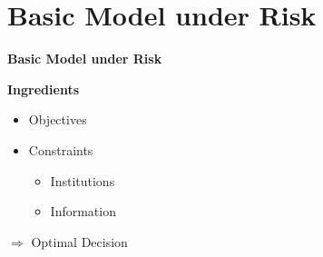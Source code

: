 \section{Basic Model under Risk}
\begin{frame}\begin{center}
\LARGE\textbf{Basic Model under Risk}
\end{center}\end{frame}
\begin{frame}
\textbf{Ingredients}\medskip
\begin{itemize}\setlength\itemsep{1em}
\item Objectives
\item Constraints\medskip
\begin{itemize}\setlength\itemsep{1em}
\item Institutions
\item Information
\end{itemize}
\end{itemize}
\vspace{0.3cm}\hspace{0.3cm}$\Rightarrow$ Optimal Decision
\end{frame}

